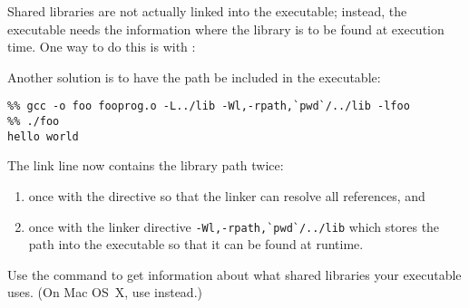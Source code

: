 Shared libraries are not actually linked into the executable;
instead, the executable needs the information where the library
is to be found at execution time. One way to do this is with
:


Another solution is to have the path be included in the executable:
\begin{verbatim}
%% gcc -o foo fooprog.o -L../lib -Wl,-rpath,`pwd`/../lib -lfoo
%% ./foo
hello world
\end{verbatim}
The link line now contains the library path twice:
\begin{enumerate}
\item once with the  directive so that the linker can resolve
  all references, and
\item once with the linker directive \verb+-Wl,-rpath,`pwd`/../lib+ which
  stores the path into the executable so that it can be found at runtime.
\end{enumerate}

Use the command  to get information about what shared libraries
your executable uses. (On Mac OS~X, use  instead.)




